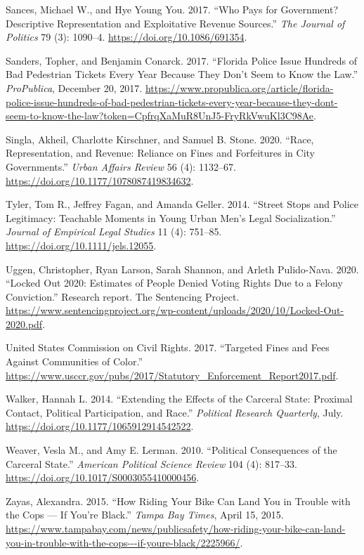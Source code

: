 \documentclass[
  12pt,
]{article}
\newlength{\cslhangindent}
\newenvironment{cslreferences}%
  {\setlength{\parindent}{0pt}%
  \everypar{\setlength{\hangindent}{\cslhangindent}}\ignorespaces}%
  {\par}
\begin{document}
\begin{cslreferences}
\leavevmode\hypertarget{ref-Sances2017}{}%
Sances, Michael W., and Hye Young You. 2017. ``Who Pays for Government? Descriptive Representation and Exploitative Revenue Sources.'' \emph{The Journal of Politics} 79 (3): 1090--4. \url{https://doi.org/10.1086/691354}.

\leavevmode\hypertarget{ref-Sanders2017}{}%
Sanders, Topher, and Benjamin Conarck. 2017. ``Florida Police Issue Hundreds of Bad Pedestrian Tickets Every Year Because They Don't Seem to Know the Law.'' \emph{ProPublica}, December 20, 2017. \url{https://www.propublica.org/article/florida-police-issue-hundreds-of-bad-pedestrian-tickets-every-year-because-they-dont-seem-to-know-the-law?token=CpfrqXaMuR8UnJ5-FryRkVwuKl3C98Ae}.

\leavevmode\hypertarget{ref-Singla2020}{}%
Singla, Akheil, Charlotte Kirschner, and Samuel B. Stone. 2020. ``Race, Representation, and Revenue: Reliance on Fines and Forfeitures in City Governments.'' \emph{Urban Affairs Review} 56 (4): 1132--67. \url{https://doi.org/10.1177/1078087419834632}.

\leavevmode\hypertarget{ref-Tyler2014}{}%
Tyler, Tom R., Jeffrey Fagan, and Amanda Geller. 2014. ``Street Stops and Police Legitimacy: Teachable Moments in Young Urban Men's Legal Socialization.'' \emph{Journal of Empirical Legal Studies} 11 (4): 751--85. \url{https://doi.org/10.1111/jels.12055}.

\leavevmode\hypertarget{ref-Uggen2020}{}%
Uggen, Christopher, Ryan Larson, Sarah Shannon, and Arleth Pulido-Nava. 2020. ``Locked Out 2020: Estimates of People Denied Voting Rights Due to a Felony Conviction.'' Research report. The Sentencing Project. \url{https://www.sentencingproject.org/wp-content/uploads/2020/10/Locked-Out-2020.pdf}.

\leavevmode\hypertarget{ref-UnitedStatesCommissiononCivilRights2017}{}%
United States Commission on Civil Rights. 2017. ``Targeted Fines and Fees Against Communities of Color.'' \url{https://www.usccr.gov/pubs/2017/Statutory_Enforcement_Report2017.pdf}.

\leavevmode\hypertarget{ref-Walker2014}{}%
Walker, Hannah L. 2014. ``Extending the Effects of the Carceral State: Proximal Contact, Political Participation, and Race.'' \emph{Political Research Quarterly}, July. \url{https://doi.org/10.1177/1065912914542522}.

\leavevmode\hypertarget{ref-Weaver2010}{}%
Weaver, Vesla M., and Amy E. Lerman. 2010. ``Political Consequences of the Carceral State.'' \emph{American Political Science Review} 104 (4): 817--33. \url{https://doi.org/10.1017/S0003055410000456}.

\leavevmode\hypertarget{ref-Zayas2015}{}%
Zayas, Alexandra. 2015. ``How Riding Your Bike Can Land You in Trouble with the Cops --- If You're Black.'' \emph{Tampa Bay Times}, April 15, 2015. \url{https://www.tampabay.com/news/publicsafety/how-riding-your-bike-can-land-you-in-trouble-with-the-cops---if-youre-black/2225966/}.
\end{cslreferences}
\end{document}
